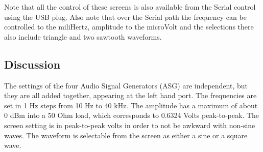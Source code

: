 Note that all the control of these screens is also available from the Serial control using the USB plug.  Also note that over the Serial path the frequency can be controlled to the miliHertz, amplitude to the microVolt and the selections there also include triangle and two sawtooth waveforms.

\subsection{Discussion}
The settings of the four Audio Signal Generators (ASG) are independent, but they are all added together, appearing at the left hand port.  The frequencies are set in 1 Hz steps from 10 Hz to 40 kHz.  The amplitude has a maximum of about 0 dBm into a 50 Ohm load, which corresponds to 0.6324 Volts peak-to-peak. The screen setting is in peak-to-peak volts in order to not be awkward with non-sine waves. The waveform is selectable from the screen as either a sine or a square wave.
